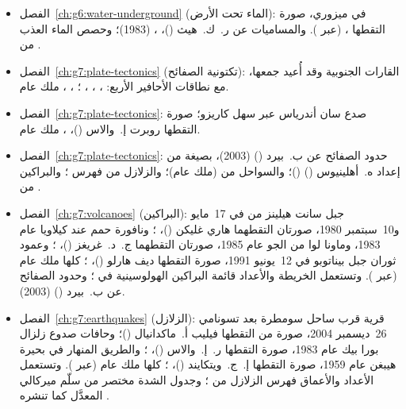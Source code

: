 \begin{itemize}
  \item الفصل~\ref{ch:g6:water-underground} (الماء تحت الأرض):  في ميزوري، صورة التقطها ،  (عبر ). والمساميات عن ر.~ك.~هيث ()، ،  (1983)؛ وحصص الماء العذب من .
  \item الفصل~\ref{ch:g7:plate-tectonics} (تكتونية الصفائح): القارات الجنوبية وقد أُعيد جمعها، مع نطاقات الأحافير الأربع: ، ، ، ؛ ، ، ملك عام.
  \item الفصل~\ref{ch:g7:plate-tectonics}: صدع سان أندرياس عبر سهل كاريزو؛ صورة التقطها روبرت إ.~والاس ()، ، ملك عام.
  \item الفصل~\ref{ch:g7:plate-tectonics}: حدود الصفائح عن ب.~بيرد () (2003)، بصيغة  من إعداد ه.~أهلينيوس () ()؛ والسواحل من  (ملك عام)؛ والزلازل من فهرس ؛ والبراكين من .
  \item الفصل~\ref{ch:g7:volcanoes} (البراكين): جبل سانت هيلينز من  في 17~مايو و10~سبتمبر 1980، صورتان التقطهما هاري غليكن ()، ؛ ونافورة حمم عند كيلاويا عام 1983، وماونا لوا من الجو عام 1985، صورتان التقطهما ج.~د.~غريغز ()، ؛ وعمود ثوران جبل بيناتوبو في 12~يونيو 1991، صورة التقطها ديف هارلو ()، ؛ كلها ملك عام (عبر ). وتستعمل الخريطة والأعداد قائمة البراكين الهولوسينية في ؛ وحدود الصفائح عن ب.~بيرد () (2003).
  \item الفصل~\ref{ch:g7:earthquakes} (الزلازل): قرية قرب ساحل سومطرة بعد تسونامي 26~ديسمبر 2004، صورة من  التقطها فيليب أ.~ماكدانيال ()؛ وحافات صدوع زلزال بورا بيك عام 1983، صورة التقطها ر.~إ.~والاس ()، ؛ والطريق المنهار في بحيرة هيبغن عام 1959، صورة التقطها إ.~ج.~ويتكايند ()، ؛ كلها ملك عام (عبر ). وتستعمل الأعداد والأعماق فهرس الزلازل من ؛ وجدول الشدة مختصر من سلّم ميركالي المعدَّل كما تنشره .

\end{itemize}
